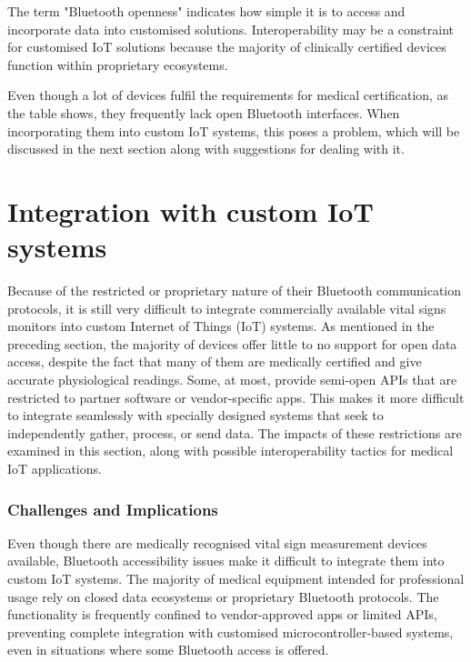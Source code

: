 The term "Bluetooth openness" indicates how simple it is to access and incorporate data into customised solutions. Interoperability may be a constraint for customised IoT solutions because the majority of clinically certified devices function within proprietary ecosystems.



Even though a lot of devices fulfil the requirements for medical certification, as the table shows, they frequently lack open Bluetooth interfaces. When incorporating them into custom IoT systems, this poses a problem, which will be discussed in the next section along with suggestions for dealing with it.

\section{Integration with custom IoT systems} %
Because of the restricted or proprietary nature of their Bluetooth communication protocols, it is still very difficult to integrate commercially available vital signs monitors into custom Internet of Things (IoT) systems. As mentioned in the preceding section, the majority of devices offer little to no support for open data access, despite the fact that many of them are medically certified and give accurate physiological readings. Some, at most, provide semi-open APIs that are restricted to partner software or vendor-specific apps. This makes it more difficult to integrate seamlessly with specially designed systems that seek to independently gather, process, or send data. The impacts of these restrictions are examined in this section, along with possible interoperability tactics for medical IoT applications.

\subsubsection{Challenges and Implications}
Even though there are medically recognised vital sign measurement devices available, Bluetooth accessibility issues make it difficult to integrate them into custom IoT systems. The majority of medical equipment intended for professional usage rely on closed data ecosystems or proprietary Bluetooth protocols. The functionality is frequently confined to vendor-approved apps or limited APIs, preventing complete integration with customised microcontroller-based systems, even in situations where some Bluetooth access is offered.

